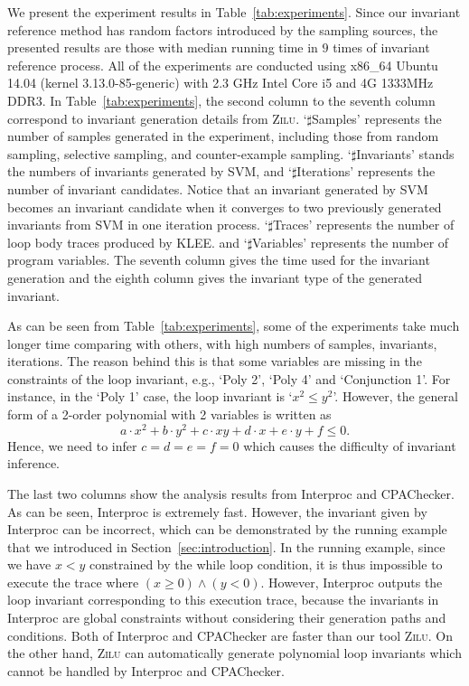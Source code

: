 We present the experiment results in Table~\ref{tab:experiments}. 
Since our invariant reference method has random factors introduced by the sampling sources, 
the presented results are those with median running time in $9$ times of invariant reference process. 
All of the experiments are conducted using x86\_64 Ubuntu 14.04 (kernel 3.13.0-85-generic) 
with 2.3 GHz Intel Core i5 and 4G 1333MHz DDR3. 
In Table~\ref{tab:experiments}, the second column to the seventh column correspond to 
invariant generation details from \textsc{Zilu}. 
`$\sharp$Samples' represents the number of samples generated in the experiment, 
including those from random sampling, selective sampling, and counter-example sampling. 
`$\sharp$Invariants' stands the numbers of invariants generated by SVM, 
and `$\sharp$Iterations' represents the number of invariant candidates. 
Notice that an invariant generated by SVM becomes an invariant candidate 
when it converges to two previously generated invariants from SVM in one iteration process. 
`$\sharp$Traces' represents the number of loop body traces produced by KLEE\cite{cadar2008klee}. 
and `$\sharp$Variables' represents the number of program variables. 
The seventh column gives the time used for the invariant generation 
and the eighth column gives the invariant type of the generated invariant. 

As can be seen from Table~\ref{tab:experiments}, 
some of the experiments take much longer time comparing with others, 
with high numbers of samples, invariants, iterations. 
The reason behind this is 
that some variables are missing in the constraints of the loop invariant, 
e.g., `Poly 2', `Poly 4' and `Conjunction 1'.  
For instance, in the `Poly 1' case, the loop invariant is `$x^2 \le y^2$'. 
However, the general form of a 2-order polynomial with 2 variables 
is written as 
\[
    a \cdot x^2 + b \cdot y^2 + c \cdot x y + d \cdot x + e \cdot y + f \le 0. 
\] 
Hence, we need to infer $c = d = e = f = 0$ 
which causes the difficulty of invariant inference. 

The last two columns show the analysis results from Interproc and CPAChecker. 
As can be seen, Interproc is extremely fast. 
However, the invariant given by Interproc can be incorrect, 
which can be demonstrated by the running example 
that we introduced in Section~\ref{sec:introduction}. 
In the running example, since we have $x < y$ constrained by the while loop condition, 
it is thus impossible to execute the trace where $(x \ge 0) \land (y < 0)$. 
However, Interproc outputs the loop invariant corresponding to this execution trace, 
because the invariants in Interproc are global constraints 
without considering their generation paths and conditions. 
Both of Interproc and CPAChecker are faster than our tool \textsc{Zilu}. 
On the other hand, \textsc{Zilu} can automatically generate polynomial loop invariants 
which cannot be handled by Interproc and CPAChecker. 

